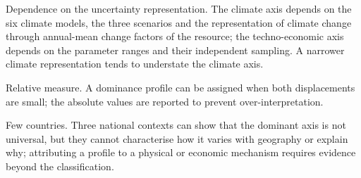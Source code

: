 Dependence on the uncertainty representation. The climate axis depends on the
six climate models, the three scenarios and the representation of climate
change through annual-mean change factors of the resource; the techno-economic
axis depends on the parameter ranges and their independent sampling. A narrower
climate representation tends to understate the climate axis.

Relative measure. A dominance profile can be assigned when both displacements are
small; the absolute values are reported to prevent over-interpretation.

Few countries. Three national contexts can show that the dominant axis is not
universal, but they cannot characterise how it varies with geography or explain
why; attributing a profile to a physical or economic mechanism requires evidence
beyond the classification.
